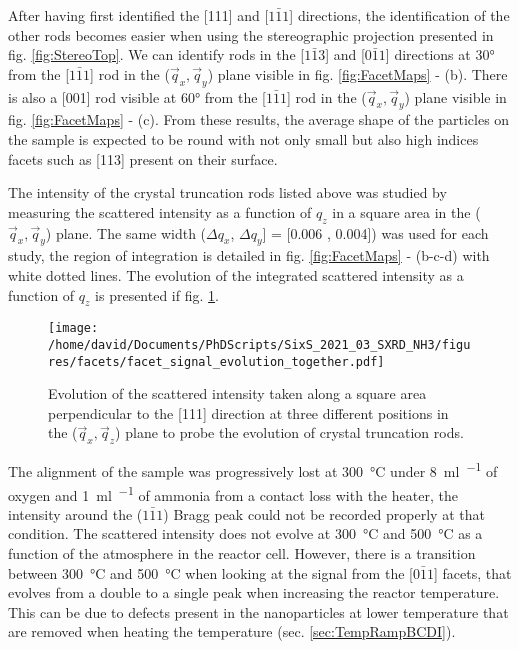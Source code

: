 After having first identified the [111] and [$1\bar{1}1$] directions, the identification of the other rods becomes easier when using the stereographic projection presented in fig. \ref{fig:StereoTop}.
We can identify rods in the [$1\bar{1}3$] and [$0\bar{1}1$] directions at \ang{30} from the [$1\bar{1}1$] rod in the ($\vec{q}_x, \vec{q}_y$) plane visible in fig. \ref{fig:FacetMaps} - (b).
There is also a [001] rod visible at \ang{60} from the [$1\bar{1}1$] rod in the ($\vec{q}_x, \vec{q}_y$) plane visible in fig. \ref{fig:FacetMaps} - (c).
From these results, the average shape of the particles on the sample is expected to be round with not only small but also high indices facets such as [113] present on their surface.

The intensity of the crystal truncation rods listed above was studied by measuring the scattered intensity as a function of $q_z$ in a square area in the ($\vec{q}_x, \vec{q}_y$) plane.
The same width ($\Delta q_x$, $\Delta q_y$] = [0.006 , 0.004]) was used for each study, the region of integration is detailed in fig. \ref{fig:FacetMaps} - (b-c-d) with white dotted lines.
The evolution of the integrated scattered intensity as a function of $q_z$ is presented if fig. \ref{fig:FacetSignal}.

\begin{figure}[!htb]
    \centering
    \texttt{[image: /home/david/Documents/PhDScripts/SixS\_2021\_03\_SXRD\_NH3/figures/facets/facet\_signal\_evolution\_together.pdf]}
    \caption{
    Evolution of the scattered intensity taken along a square area perpendicular to the [111] direction at three different positions in the ($\vec{q}_x, \vec{q}_z$) plane to probe the evolution of crystal truncation rods.
    }
    \label{fig:FacetSignal}
\end{figure}

The alignment of the sample was progressively lost at \qty{300}{\degreeCelsius} under \qty{8}{\ml\per\min} of oxygen and \qty{1}{\ml\per\min} of ammonia from a contact loss with the heater, the intensity around the ($1\bar{1}1$) Bragg peak could not be recorded properly at that condition.
The scattered intensity does not evolve at \qty{300}{\degreeCelsius} and \qty{500}{\degreeCelsius} as a function of the atmosphere in the reactor cell.
However, there is a transition between \qty{300}{\degreeCelsius} and \qty{500}{\degreeCelsius} when looking at the signal from the [$0\bar{1}1$] facets, that evolves from a double to a single peak when increasing the reactor temperature.
This can be due to defects present in the nanoparticles at lower temperature that are removed when heating the temperature (sec. \ref{sec:TempRampBCDI}).

